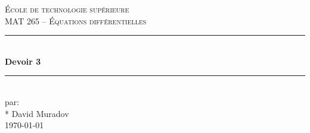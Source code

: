 \documentclass[11pt, letterpaper]{article}
\begin{document}
\begin{titlepage}
\center

\vspace*{2cm}

\textsc{\LARGE École de technologie supérieure}\\[1cm]
\textsc{\Large MAT 265 -- Équations différentielles}\\[1.5cm]

\rule{\linewidth}{0.5mm} \\[0.5cm]
{\LARGE \bfseries Devoir 3} \\[0.2cm]
\rule{\linewidth}{0.5mm} \\[3cm]

\large par: \\*
David Muradov\\[8cm]


{\large \today }\\[3cm]

\vfill
\end{titlepage}






\end{document}
